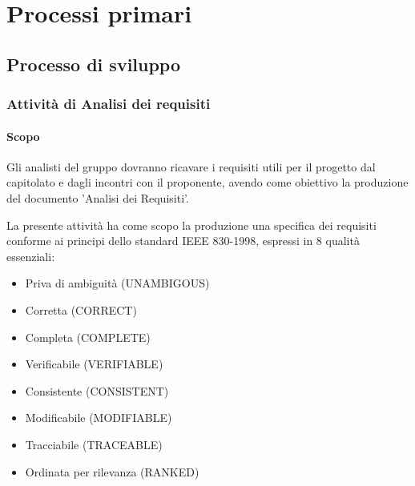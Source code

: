 

\chapter{Processi primari}
	\section{Processo di sviluppo}
		\subsection{Attività di Analisi dei requisiti}
			\subsubsection{Scopo}
				Gli analisti del gruppo dovranno ricavare i requisiti utili per il progetto
				dal capitolato e dagli incontri con il proponente, avendo come obiettivo la
				produzione del documento 'Analisi dei Requisiti'.
			
			La presente attività ha come scopo la produzione una specifica dei
			requisiti conforme ai principi dello standard IEEE 830-1998, espressi in 8 qualità
			essenziali:
				\begin{itemize}
				\item Priva di ambiguità (UNAMBIGOUS)
				\item Corretta (CORRECT)
				\item Completa (COMPLETE)
				\item Verificabile (VERIFIABLE)
				\item Consistente (CONSISTENT)
				\item Modificabile (MODIFIABLE)
				\item Tracciabile (TRACEABLE)
				\item Ordinata per rilevanza (RANKED)
				\end{itemize}
			

